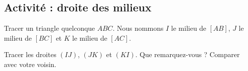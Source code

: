 
\subsection*{Activité : droite des milieux}

Tracer un triangle quelconque \( ABC\).  Nous nommons \( I\) le milieu de \( [AB]\), \( J\) le milieu de \( [BC]\) et \( K\) le milieu de \( [AC]\).

Tracer les droites \( (IJ)\), \( (JK)\) et \( (KI)\). Que remarquez-vous ? Comparer avec votre voisin.
